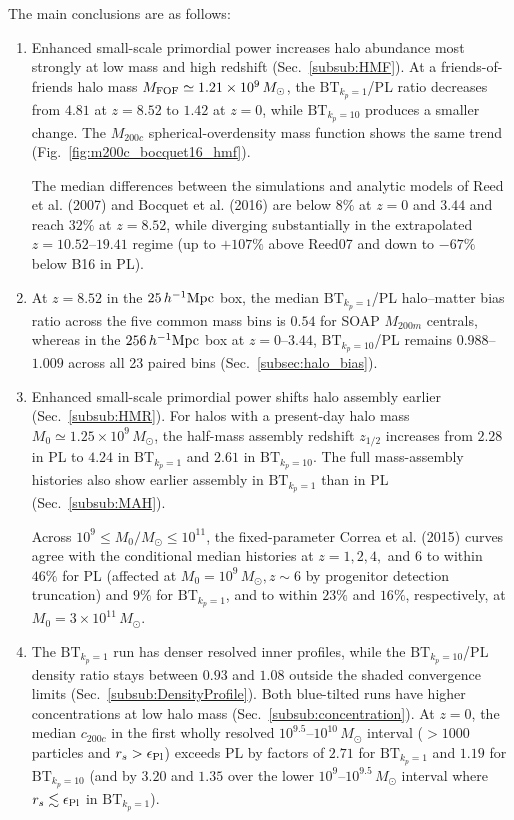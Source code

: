 \documentclass[
 reprint,
 superscriptaddress,
 nofootinbib,
 nobibnotes,
 amsmath,
 amssymb,
 aps,
 prd,
 floatfix,
 longbibliography
]{revtex4-2}
\DeclareRobustCommand{\change}[1]{#1}
\DeclareRobustCommand{\BTKPone}{\ensuremath{\mathrm{BT}_{k_p=1}}}
\DeclareRobustCommand{\BTKPten}{\ensuremath{\mathrm{BT}_{k_p=10}}}
\begin{document}
The main conclusions are as follows:
\begin{enumerate}
    \item \change{Enhanced small-scale primordial power increases halo abundance most strongly at low mass and high redshift (Sec.~\ref{subsub:HMF}). At a friends-of-friends halo mass \(M_{\rm FOF}\simeq1.21\times10^9\,M_\odot\), the \BTKPone{}/PL ratio decreases from \(4.81\) at \(z=8.52\) to \(1.42\) at \(z=0\), while \BTKPten{} produces a smaller change. The \(M_{200c}\) spherical-overdensity mass function shows the same trend (Fig.~\ref{fig:m200c_bocquet16_hmf}).}

    The median differences between the simulations and analytic models of Reed et al. (2007) \citep{Reed_2007} and Bocquet et al. (2016) \citep{Bocquet2016} are below \(8\%\) at \(z=0\) and \(3.44\) and reach \(32\%\) at \(z=8.52\), while diverging substantially in the extrapolated \(z=10.52\)--\(19.41\) regime (up to \(+107\%\) above Reed07 and down to \(-67\%\) below B16 in PL).

    \item \change{At \(z=8.52\) in the \(25\,h^{-1}{\rm Mpc}\) box, the median \BTKPone{}/PL halo--matter bias ratio across the five common mass bins is \(0.54\) for SOAP \(M_{200m}\) centrals, whereas in the \(256\,h^{-1}{\rm Mpc}\) box at \(z=0\)--\(3.44\), \BTKPten{}/PL remains \(0.988\)--\(1.009\) across all 23 paired bins (Sec.~\ref{subsec:halo_bias}).}

    \item \change{Enhanced small-scale primordial power shifts halo assembly earlier (Sec.~\ref{subsub:HMR}). For halos with a present-day halo mass \(M_0\simeq1.25\times10^9\,M_\odot\), the half-mass assembly redshift \(z_{1/2}\) increases from \(2.28\) in PL to \(4.24\) in \BTKPone{} and \(2.61\) in \BTKPten{}. The full mass-assembly histories also show earlier assembly in \BTKPone{} than in PL (Sec.~\ref{subsub:MAH}).}

    \change{Across \(10^9\le M_0/M_\odot\le10^{11}\), the fixed-parameter Correa et al. (2015) curves \citep{Correa2015MAHI} agree with the conditional median histories at \(z=1,2,4,\) and \(6\) to within \(46\%\) for PL (affected at \(M_0=10^9\,M_\odot, z\sim6\) by progenitor detection truncation) and \(9\%\) for \BTKPone{}, and to within \(23\%\) and \(16\%\), respectively, at \(M_0=3\times10^{11}\,M_\odot\).}

    \item The \BTKPone{} run has denser resolved inner profiles, while the \BTKPten{}/PL density ratio stays between \(0.93\) and \(1.08\) outside the shaded convergence limits (Sec.~\ref{subsub:DensityProfile}). Both blue-tilted runs have higher concentrations at low halo mass (Sec.~\ref{subsub:concentration}). At \(z=0\), the median \(c_{200c}\) in the first wholly resolved \(10^{9.5}\)--\(10^{10}\,M_\odot\) interval (\(>1000\) particles and \(r_s>\epsilon_{\rm Pl}\)) exceeds PL by factors of \(2.71\) for \BTKPone{} and \(1.19\) for \BTKPten{} (and by \(3.20\) and \(1.35\) over the lower \(10^9\)--\(10^{9.5}\,M_\odot\) interval where \(r_s\lesssim\epsilon_{\rm Pl}\) in \BTKPone{}).



\end{enumerate}
\end{document}

